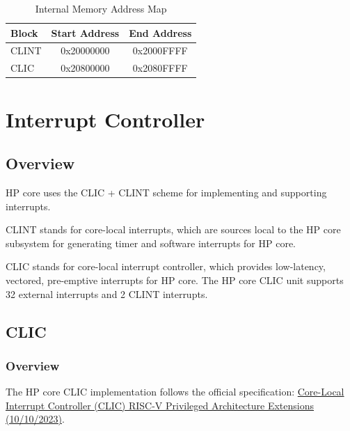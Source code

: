 \documentclass[main\_\_EN.tex]{subfiles}
\begin{document}
\begin{longtable}{ | l | c | c |}
\caption{Internal Memory Address Map} \label{tab:riscvcpu-tcip-slave-table}
\\ \hline
\rowcolor{lightgray}
Block & Start Address & End Address \\ \hline
CLINT & 0x20000000  &  0x2000FFFF\\ \hline
CLIC & 0x20800000  &  0x2080FFFF\\ \hline
\end{longtable}

\newpage
\section{Interrupt Controller}
\label{sec:riscvcpu-int-ctrl}


\subsection{Overview}
\label{sec:riscvcpu-intr-overview}


HP core uses the CLIC + CLINT scheme for implementing and supporting interrupts.

CLINT stands for core-local interrupts, which are sources local to the HP core subsystem for generating timer and software interrupts for HP core.

CLIC stands for core-local interrupt controller, which provides low-latency, vectored, pre-emptive interrupts for HP core.
The HP core CLIC unit supports 32 external interrupts and 2 CLINT interrupts.


\subsection{CLIC}
\label{sec:riscvcpu-clic}

\subsubsection{Overview}
\label{sec:riscvcpu-clic-overview}


The HP core CLIC implementation follows the official specification: \href{https://github.com/riscv/riscv-fast-interrupt/blob/v0.9/src/clic.adoc}{Core-Local Interrupt Controller (CLIC) RISC-V Privileged Architecture Extensions (10/10/2023)}.
\end{document}
